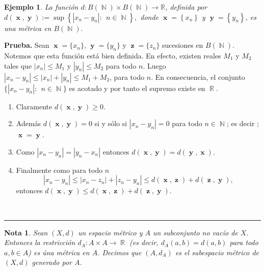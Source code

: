 \documentclass[x11names, 12pt]{book}
\newtheorem{example}{Ejemplo}
\newtheorem{remark}{Nota}
\newenvironment{prueba}[1][Prueba]{\noindent\textbf{#1.} }{\ \rule{0.5em}{0.5em}}
\DeclareMathOperator{\y}{\textbf{y}}
\DeclareMathOperator{\z}{\textbf{z}}
\DeclareMathOperator{\x}{\textbf{x}}
\DeclareMathOperator{\ene}{\mathbb{N}}
\DeclareMathOperator{\R}{\mathbb{R}}
\begin{document}
\begin{example}
La función $d:B(\ene)\times B(\ene) \to \mathbb{R}$, definida por $d(\x , \y):=\sup\left\{ |x_n-y_n|: \ \ n\in \ene \right\},$ donde $\x=\left\{x_n \right\}$ y $\y=\left\{y_n \right\}$, es una métrica en $B(\ene).$
\end{example}
\begin{prueba}
Sean $\x=\{x_n\}$, $\y=\{y_n\}$ y $\z=\{z_n\}$ sucesiones en $B(\ene)$. Notemos que esta función está bien definida. En efecto, existen reales $M_1$ y $M_2$ tales que  $|x_n|\leq M_1$ y $|y_n|\leq M_2$ para todo $n$. Luego $|x_n-y_n|\leq |x_n|+|y_n|\leq M_1+M_2$, para todo $n$. En consecuencia, el conjunto $\{|x_n-y_n|:\ \ n\in \ene\}$ es acotado y por tanto el supremo existe en $\R$.
\begin{enumerate}
    \item Claramente $d(\x, \y) \geq 0$.  
    \item Además $d(\x, \y)=0$ si y sólo si $|x_n-y_n|=0$ para todo $n\in \ene$; es decir ; $\x=\y$.
    \item Como $|x_n-y_n|=|y_n-x_n|$ entonces $d(\x, \y)=d(\y, \x)$.  
    \item Finalmente como para todo $n$ \[|x_n-y_n|\leq |x_n-z_n|+|z_n-y_n|\leq d(\x, \z)+ d(\z,\y),\]
    entonces $ d(\x, \y)\leq d(\x, \z)+ d(\z,\y).$
\end{enumerate}
\end{prueba}

\begin{remark}
Sean $(X,d)$ un espacio métrico y $A$ un subconjunto no vacío de $X$. Entonces la restricción \linebreak $d_A:A\times A \to \R$ (es decir, $d_A(a,b)=d(a,b)$ para todo $a,b\in A$) es úna métrica en $A$. Decimos que $(A, d_A)$ es el subespacio métrico de $(X,d)$ generado por $A$.
\end{remark}
\end{document}
